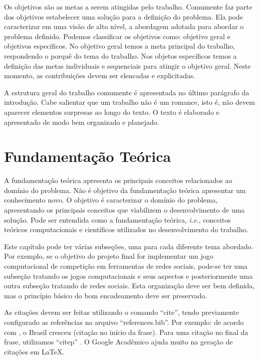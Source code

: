 \documentclass[12pt]{article}
\begin{document}
	Os objetivos são as metas a serem atingidas pelo trabalho. Comumente faz parte dos objetivos estabelecer uma solução para a definição do problema. Ela pode caracterizar em uma visão de alto nível, a abordagem adotada para abordar o problema definido. Podemos classificar os objetivos como: objetivo geral e objetivos específicos. No objetivo geral temos a meta principal do trabalho, respondendo o porquê do tema do trabalho. Nos objetos específicos temos a definição das metas individuais e sequenciais para atingir o objetivo geral. Neste momento, as contribuições devem ser elencadas e explicitadas.
	
	A estrutura geral do trabalho comumente é apresentada no último parágrafo da introdução. Cabe salientar que um trabalho não é um romance, isto é, não devem aparecer elementos surpresas ao longo do texto. O texto é elaborado e apresentado de modo bem organizado e planejado. 

\section{Fundamentação Teórica}
\label{sec:fund_teorica}
	
    A fundamentação teórica apresenta os principais conceitos relacionados ao domínio do problema. Não é objetivo da fundamentação teórica apresentar um conhecimento novo. O objetivo é caracterizar o domínio do problema, apresentando os principais conceitos que viabilizem o desenvolvimento de uma solução. Pode ser entendida como a fundamentação teórica, \emph{i.e.}, conceitos teóricos computacionais e científicos utilizados no desenvolvimento do trabalho.
	
    Este capítulo pode ter várias subseções, uma para cada diferente tema abordado. Por exemplo, se o objetivo do projeto final for implementar um jogo computacional de competição em ferramentas de redes sociais, pode-se ter uma subseção tratando os jogos computacionais e seus aspectos e posteriormente uma outra subseção tratando de redes sociais. Esta organização deve ser bem definida, mas o princípio básico do bom encadeamento deve ser preservado.

    As citações devem ser feitas utilizando o comando ``cite'', tendo previamente configurado as referências no arquivo ``references.bib''. Por exemplo: de acordo com \cite{IBGE}, o Brasil cresceu (citação no início da frase). Para uma citação no final da frase, utilizamos ``citep'' \citep{wazlawick_metodologia_2017}. O Google Acadêmico ajuda muito na geração de citações em LaTeX.
	
\end{document}
